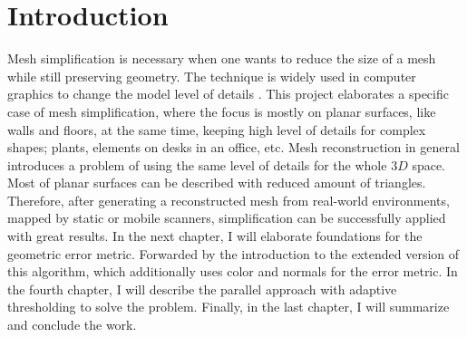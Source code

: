 \chapter{Introduction}
\setcounter{page}{1}%
\thispagestyle{empty}

Mesh simplification is necessary when one wants to reduce the size of a mesh while still preserving geometry. The technique is widely used in computer graphics to change the model level of details \cite{lod03}. This project elaborates a specific case of mesh simplification, where the focus is mostly on planar surfaces, like walls and floors, at the same time, keeping high level of details for complex shapes; plants, elements on desks in an office, etc. Mesh reconstruction in general introduces a problem of using the same level of details for the whole $3D$ space. Most of planar surfaces can be described with reduced amount of triangles. Therefore, after generating a reconstructed mesh from real-world environments, mapped by static or mobile scanners, simplification can be successfully applied with great results. In the next chapter, I will elaborate foundations for the geometric error metric. Forwarded by the introduction to the extended version of this algorithm, which additionally uses color and normals for the error metric. In the fourth chapter, I will describe the parallel approach with adaptive thresholding to solve the problem. Finally, in the last chapter, I will summarize and conclude the work.